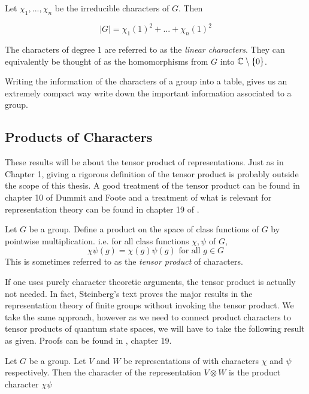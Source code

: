 \begin{theorem}
    Let $\chi_1, ... ,\chi_n$ be the irreducible characters of $G$. Then

    \[
        |G| = \chi_1(1)^2 + ... + \chi_n(1)^2
    \]
\end{theorem}

\begin{definition}
    The characters of degree $1$ are referred to as the \emph{linear characters}. They can equivalently be thought 
    of as the homomorphisms from $G$ into $\mathbb{C}\setminus \{0\}$.
\end{definition}

    
    Writing the information of the characters of a group into a table, gives us an extremely compact way write down 
    the important information associated to a group.


\subsection{Products of Characters}

These results will be about the tensor product of representations. Just as in Chapter 1, giving a rigorous 
definition of the tensor product is probably outside the scope of this thesis. A good treatment of the tensor 
product can be found in chapter 10 of Dummit and Foote \cite{foote} and a treatment of what is relevant for 
representation theory can be found in chapter 19 of \cite{James&Liebeck}.

\begin{definition}
    Let $G$ be a group. Define a product on the space of class functions of $G$ by pointwise multiplication. i.e.
    for all class functions $\chi, \psi$ of $G$, 
    \[
        \chi\psi(g) = \chi(g)\psi(g) \text{ for all } g \in G
    \]
    This is sometimes referred to as the \emph{tensor product} of characters.
\end{definition}

If one uses purely character theoretic arguments, the tensor product is actually not needed. In fact, Steinberg's 
text \cite{steinberg} proves the major results in the representation theory of finite groups without invoking the 
tensor product. We take the same approach, however as we need to connect product characters to tensor products of 
quantum state spaces, we will have to take the following result as given. Proofs can be found in 
\cite{James&Liebeck}, chapter 19.

\begin{proposition}
    Let $G$ be a group. Let $V$ and $W$ be representations of with characters $\chi$ and $\psi$ respectively. Then 
    the character of the representation $V \otimes W$ is the product character $\chi\psi$
\end{proposition}


